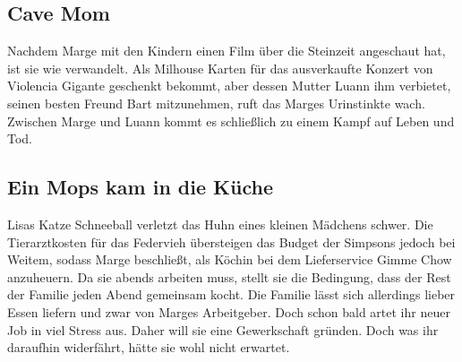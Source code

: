 \subsection{Cave Mom}
Nachdem Marge mit den Kindern einen Film über die Steinzeit angeschaut hat, ist sie wie verwandelt. Als Milhouse Karten für das ausverkaufte Konzert von Violencia Gigante geschenkt bekommt, aber dessen Mutter Luann ihm verbietet, seinen besten Freund Bart mitzunehmen, ruft das Marges Urinstinkte wach. Zwischen Marge und Luann kommt es schließlich zu einem Kampf auf Leben und Tod.


\subsection{Ein Mops kam in die Küche}\label{35ABF07}
Lisas Katze Schneeball verletzt das Huhn eines kleinen Mädchens schwer. Die Tierarztkosten für das Federvieh übersteigen das Budget der Simpsons jedoch bei Weitem, sodass Marge beschließt, als Köchin bei dem Lieferservice Gimme Chow anzuheuern. Da sie abends arbeiten muss, stellt sie die Bedingung, dass der Rest der Familie jeden Abend gemeinsam kocht. Die Familie lässt sich allerdings lieber Essen liefern und zwar von Marges Arbeitgeber. Doch schon bald artet ihr neuer Job in viel Stress aus. Daher will sie eine Gewerkschaft gründen. Doch was ihr daraufhin widerfährt, hätte sie wohl nicht erwartet.


